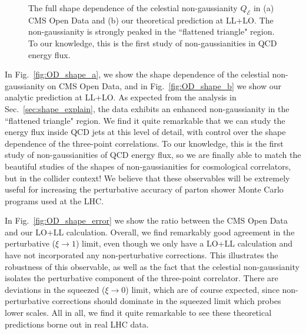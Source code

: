 \documentclass[letterpaper,11pt]{article}
\def\Fig#1{Fig.~{\ref{#1}}}
\def\to{\rightarrow}
\DeclareRobustCommand{\Sec}[1]{Sec.~\ref{#1}}
\DeclareRobustCommand{\Fig}[1]{Fig.~\ref{#1}}
\begin{document}
\begin{figure}
\begin{center}
\qquad
{}\qquad
\end{center}
\caption{The full shape dependence of the celestial non-gaussianity $Q_\mathcal{E}$  in (a) CMS Open Data and (b) our theoretical prediction at LL+LO. The non-gaussianity is strongly peaked in the  ``flattened triangle" region. To our knowledge, this is the first study of non-gaussianities in QCD energy flux.}
\label{fig:OD_shape}
\end{figure}





In \Fig{fig:OD_shape_a}, we show the shape dependence of the celestial non-gaussianity on CMS Open Data, and in \Fig{fig:OD_shape_b} we show our analytic prediction at LL+LO.
%
As expected from the analysis in \Sec{sec:shape_explain}, the data exhibits an enhanced non-gaussianity in the ``flattened triangle" region.
%
We find it quite remarkable that we can study the energy flux inside QCD jets at this level of detail, with control over the shape dependence of the three-point correlations.
%
To our knowledge, this is the first study of non-gaussianities of QCD energy flux, so we are finally able to match the beautiful studies of the shapes of non-gaussianities for cosmological correlators, but in the collider context!
%
We believe that these observables will be extremely useful for increasing the perturbative accuracy of parton shower Monte Carlo programs used at the LHC.




In \Fig{fig:OD_shape_error} we show the ratio between the CMS Open Data and our LO+LL calculation.
%
Overall, we find remarkably good agreement in the perturbative ($\xi\to 1$) limit, even though we only have a LO+LL calculation and have not incorporated any non-perturbative corrections.
%
This illustrates the robustness of this observable, as well as the fact that the celestial non-gaussianity isolates the perturbative component of the three-point correlator.
%
There are deviations in the squeezed ($\xi\to 0$) limit, which are of course expected, since non-perturbative corrections should dominate in the squeezed limit which probes lower scales.
%
All in all, we find it quite remarkable to see these theoretical predictions borne out in real LHC data.
\end{document}
